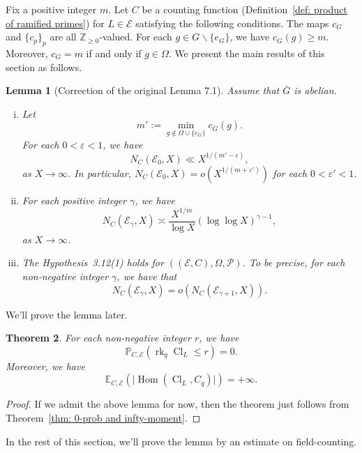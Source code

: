 \documentclass{amsart}
\numberwithin{equation}{section}
\theoremstyle{plain}
\newtheorem{theorem}{Theorem}[section]
\newtheorem{lemma}[theorem]{Lemma}
\theoremstyle{definition}
\theoremstyle{remark}
\begin{document}
Fix a positive integer $m$.
Let $C$ be a counting function (Definition~\ref{def: product of ramified primes}) for $L\in\mathcal{E}$ satisfying the following conditions.
The maps $c_G$ and $\{c_p\}_{p}$ are all $\mathbb{Z}_{\geq0}$-valued.
For each $g\in G\backslash\{e_G\}$, we have $c_G(g)\geq m$.
Moreover, $c_G=m$ if and only if $g\in\Omega$.
We present the main results of this section as follows.
\begin{lemma}[Correction of the original Lemma 7.1]\label{lemma of general case}
	Assume that $\bar{G}$ is abelian.
	\begin{enumerate}[(i)]
		\item Let
		\begin{equation*}
			m':=\min_{g\notin\Omega\cup\{e_G\}}c_G(g).
		\end{equation*} 
		For each $0<\varepsilon<1$, we have
		\begin{equation*}
			N_C(\mathcal{E}_0,X)\ll X^{1/(m'-\varepsilon)},
		\end{equation*}
		as $X\to\infty$.
		In particular, $N_C(\mathcal{E}_0,X)=o(X^{1/(m+\varepsilon')})$ for each $0<\varepsilon'<1$.
		\item For each positive integer $\gamma$, we have
		\begin{equation*}
			N_C(\mathcal{E}_{\gamma},X)\asymp\frac{X^{1/m}}{\log X}(\log\log X)^{\gamma-1},
		\end{equation*}
		as $X\to\infty$.
		\item The Hypothesis~3.12(1) holds for $((\mathcal{E},C),\Omega,\mathcal{P})$.
		To be precise, for each non-negative integer $\gamma$, we have that
		\begin{equation*}
			N_C(\mathcal{E}_{\gamma},X)=o(N_C(\mathcal{E}_{\gamma+1},X)).
		\end{equation*}
	\end{enumerate}
\end{lemma}
We'll prove the lemma later.
\begin{theorem}\label{theorem of general case}
	For each non-negative integer $r$, we have
	\begin{equation*}
		\mathbb{P}_{C,\mathcal{E}}(\operatorname{rk}_q\operatorname{Cl}_L\leq r)=0.
	\end{equation*}
	Moreover, we have
	\begin{equation*}
		\mathbb{E}_{C,\mathcal{E}}(\lvert\operatorname{Hom}(\operatorname{Cl}_L,C_q)\rvert)=+\infty.
	\end{equation*}
\end{theorem}
\begin{proof}
	If we admit the above lemma for now, then the theorem just follows from Theorem~\ref{thm: 0-prob and infty-moment}.
\end{proof}
In the rest of this section, we'll prove the lemma by an estimate on field-counting.
\end{document}
